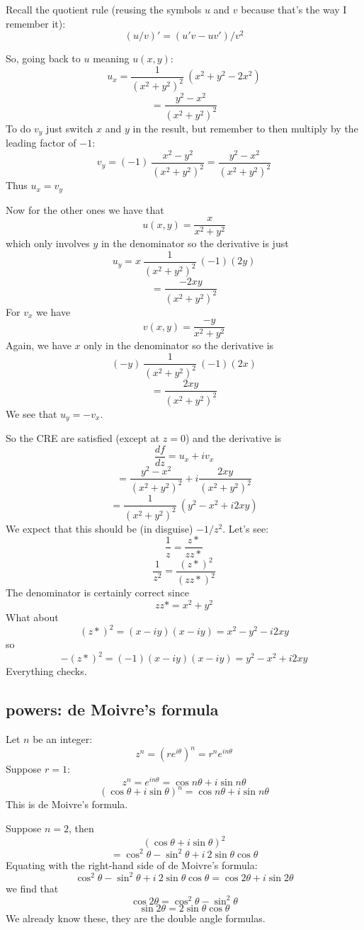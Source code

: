 \documentclass[11pt, oneside]{article}   	%
\begin{document}
Recall the quotient rule (reusing the symbols $u$ and $v$ because that's the way I remember it):
\[ (u/v)' = (u'v - uv')/v^2 \]

So, going back to $u$ meaning $u(x,y)$:
\[ u_x = \frac{1}{(x^2 + y^2)^2} \ (x^2 + y^2 - 2x^2) \]
\[ = \frac{y^2 - x^2}{(x^2 + y^2)^2} \]
To do $v_y$ just switch $x$ and $y$ in the result, but remember to then multiply by the leading factor of $-1$:
\[ v_y = (-1) \ \frac{x^2 - y^2}{(x^2 + y^2)^2} = \frac{y^2 - x^2}{(x^2 + y^2)^2} \]
Thus $u_x = v_y$

Now for the other ones we have that
\[ u(x,y) = \frac{x}{x^2 + y^2} \]
which only involves $y$ in the denominator so the derivative is just
\[ u_y = x \ \frac{1}{(x^2 + y^2)^2} \ (-1) (2y) \]
\[ = \frac{-2xy}{(x^2 + y^2)^2} \]
For $v_x$ we have 
\[ v(x,y) = \frac{-y}{x^2 + y^2} \]
Again, we have $x$ only in the denominator so the derivative is
\[ (-y) \ \frac{1}{(x^2 + y^2)^2} \ (-1) (2x) \]
\[ = \frac{2xy}{(x^2 + y^2)^2} \]
We see that $u_y = - v_x$.

So the CRE are satisfied (except at $z=0$) and the derivative is
\[ \frac{df}{dz} = u_x + i v_x \]
\[ =  \frac{y^2 - x^2}{(x^2 + y^2)^2} + i \frac{2xy}{(x^2 + y^2)^2} \]
\[ = \frac{1}{(x^2 + y^2)^2} \ (y^2 - x^2 + i2xy) \]
We expect that this should be (in disguise) $-1/z^2$.  Let's see:
\[ \frac{1}{z} =  \frac{z*}{zz*} \]
\[ \frac{1}{z^2} =  \frac{(z*)^2}{(zz*)^2} \]
The denominator is certainly correct since
\[ zz* = x^2 + y^2 \]
What about
\[ (z*)^2 = (x - iy)(x - iy) = x^2 - y^2 - i2xy \]
so
\[ -(z*)^2 = (-1)(x - iy)(x - iy) = y^2 - x^2 + i2xy \]
Everything checks.

\subsection*{powers:  de Moivre's formula}
Let $n$ be an integer:
\[ z^n = (re^{i\theta})^n = r^n e^{in\theta} \]
Suppose $r=1$:
\[ z^n = e^{in\theta} = \cos n \theta + i \sin n \theta \]
\[ (\cos \theta + i \sin \theta)^n = \cos n \theta + i \sin n \theta \]
This is de Moivre's formula.

Suppose $n=2$, then
\[ (\cos \theta + i \sin \theta)^2 \]
\[ = \cos^2 \theta - \sin^2 \theta + i\ 2 \sin \theta \cos \theta \]
Equating with the right-hand side of de Moivre's formula:
\[ \cos^2 \theta - \sin^2 \theta + i\ 2 \sin \theta \cos \theta = \cos 2 \theta + i \sin 2 \theta \]
we find that
\[ \cos 2 \theta = \cos^2 \theta - \sin^2 \theta \]
\[ \sin 2 \theta = 2 \sin \theta \cos \theta \]
We already know these, they are the double angle formulas.
\end{document}
